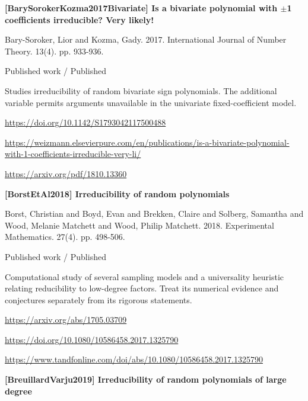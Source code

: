 \documentclass[11pt,a4paper,oneside,openany]{book}
\begin{document}
\vspace{9pt}
\hypertarget{ref:BarySorokerKozma2017Bivariate}{}
{\sffamily\bfseries\color{atlasgreen}[BarySorokerKozma2017Bivariate] Is a bivariate polynomial with \ensuremath{\pm}1 coefficients irreducible? Very likely!}\par
\color{black} Bary-Soroker, Lior and Kozma, Gady. 2017. International Journal of Number Theory. 13(4). pp. 933-936.\par
{\small\sffamily\color{atlasgold}Published work / Published}\par
\color{black} Studies irreducibility of random bivariate sign polynomials. The additional variable permits arguments unavailable in the univariate fixed-coefficient model.\par
{\footnotesize\url{https://doi.org/10.1142/S1793042117500488}}\par
{\footnotesize\url{https://weizmann.elsevierpure.com/en/publications/is-a-bivariate-polynomial-with-1-coefficients-irreducible-very-li/}}\par
{\footnotesize\url{https://arxiv.org/pdf/1810.13360}}\par
\vspace{9pt}
\hypertarget{ref:BorstEtAl2018}{}
{\sffamily\bfseries\color{atlasgreen}[BorstEtAl2018] Irreducibility of random polynomials}\par
\color{black} Borst, Christian and Boyd, Evan and Brekken, Claire and Solberg, Samantha and Wood, Melanie Matchett and Wood, Philip Matchett. 2018. Experimental Mathematics. 27(4). pp. 498-506.\par
{\small\sffamily\color{atlasgold}Published work / Published}\par
\color{black} Computational study of several sampling models and a universality heuristic relating reducibility to low-degree factors. Treat its numerical evidence and conjectures separately from its rigorous statements.\par
{\footnotesize\url{https://arxiv.org/abs/1705.03709}}\par
{\footnotesize\url{https://doi.org/10.1080/10586458.2017.1325790}}\par
{\footnotesize\url{https://www.tandfonline.com/doi/abs/10.1080/10586458.2017.1325790}}\par
\vspace{9pt}
\hypertarget{ref:BreuillardVarju2019}{}
{\sffamily\bfseries\color{atlasgreen}[BreuillardVarju2019] Irreducibility of random polynomials of large degree}\par
\end{document}
